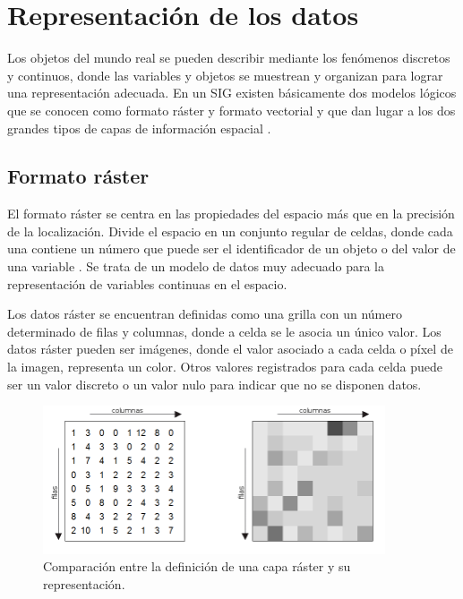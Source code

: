 \section{Representación de los datos }
\label{sec:cap2-tecnicas-graficas-representacion}
Los objetos del mundo real se pueden describir mediante los fenómenos discretos y continuos, donde las variables y objetos se muestrean y organizan para lograr una representación adecuada. En un
SIG existen básicamente dos modelos lógicos que se conocen como formato ráster y formato vectorial
y que dan lugar a los dos grandes tipos de capas de información espacial \cite{fAlonsoSig2006}.

\subsection{Formato ráster}
El formato ráster se centra en las propiedades del espacio más que en la precisión de la
localización. Divide el espacio en un conjunto regular de celdas, donde cada una contiene un
número que puede ser el identificador de un objeto o del valor de una variable
\cite{fAlonsoSig2006}. Se trata de un modelo de datos muy adecuado para la representación de
variables continuas en el espacio.

Los datos ráster se encuentran definidas como una grilla con un número determinado de filas y
columnas, donde a celda se le asocia un único valor. Los datos ráster pueden ser imágenes, donde
el valor asociado a cada celda o píxel de la imagen, representa un color. Otros valores
registrados para cada celda puede ser un valor discreto o un valor nulo para indicar que no se
disponen datos.

\begin{figure}[!htbp]
\centering
\includegraphics[width=0.9\textwidth]{capitulo-2/graphics/representacion-raster.png}
\caption{\label{fig:sig-capa-raster} Comparación entre la definición de una capa ráster y su representación. }
\end{figure}

